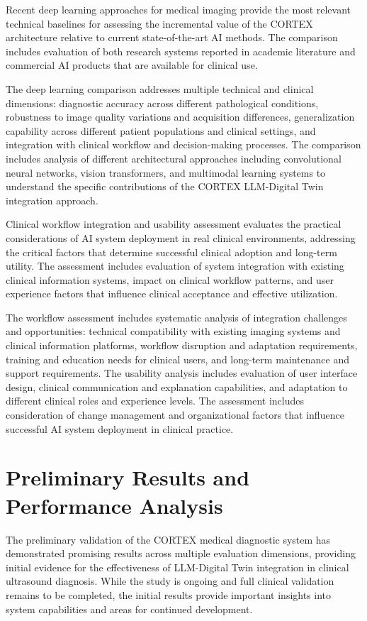 Recent deep learning approaches for medical imaging provide the most relevant technical baselines for assessing the incremental value of the CORTEX architecture relative to current state-of-the-art AI methods. The comparison includes evaluation of both research systems reported in academic literature and commercial AI products that are available for clinical use.

The deep learning comparison addresses multiple technical and clinical dimensions: diagnostic accuracy across different pathological conditions, robustness to image quality variations and acquisition differences, generalization capability across different patient populations and clinical settings, and integration with clinical workflow and decision-making processes. The comparison includes analysis of different architectural approaches including convolutional neural networks, vision transformers, and multimodal learning systems to understand the specific contributions of the CORTEX LLM-Digital Twin integration approach.

Clinical workflow integration and usability assessment evaluates the practical considerations of AI system deployment in real clinical environments, addressing the critical factors that determine successful clinical adoption and long-term utility. The assessment includes evaluation of system integration with existing clinical information systems, impact on clinical workflow patterns, and user experience factors that influence clinical acceptance and effective utilization.

The workflow assessment includes systematic analysis of integration challenges and opportunities: technical compatibility with existing imaging systems and clinical information platforms, workflow disruption and adaptation requirements, training and education needs for clinical users, and long-term maintenance and support requirements. The usability analysis includes evaluation of user interface design, clinical communication and explanation capabilities, and adaptation to different clinical roles and experience levels. The assessment includes consideration of change management and organizational factors that influence successful AI system deployment in clinical practice.

\section{Preliminary Results and Performance Analysis}

The preliminary validation of the CORTEX medical diagnostic system has demonstrated promising results across multiple evaluation dimensions, providing initial evidence for the effectiveness of LLM-Digital Twin integration in clinical ultrasound diagnosis. While the study is ongoing and full clinical validation remains to be completed, the initial results provide important insights into system capabilities and areas for continued development.

